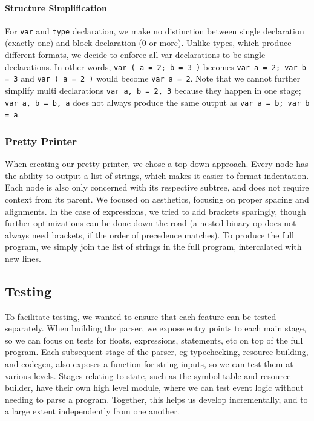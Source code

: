 \documentclass[11pt]{article}
\begin{document}
\paragraph{Structure Simplification}
For \texttt{var} and \texttt{type} declaration, we make no distinction
between single declaration (exactly one) and block declaration (0 or
more). Unlike types, which produce different formats, we decide to
enforce all var declarations to be single declarations. In other
words, \texttt{var ( a = 2; b = 3 )} becomes \texttt{var a = 2; var b = 3}
and \texttt{var ( a = 2 )} would become \texttt{var a = 2}. Note
that we cannot further simplify multi declarations \texttt{var a, b
  = 2, 3} because they happen in one stage;
  \texttt{var a, b = b, a} does not always produce the same output as
  \texttt{var a = b; var b = a}.

\subsubsection{Pretty Printer}
When creating our pretty printer, we chose a top down approach.  Every
node has the ability to output a list of strings, which makes it
easier to format indentation. Each node is also only concerned with
its respective subtree, and does not require context from its
parent. We focused on aesthetics, focusing on proper spacing and
alignments. In the case of expressions, we tried to add brackets
sparingly, though further optimizations can be done down the road (a
nested binary op does not always need brackets, if the order of
precedence matches). To produce the full program, we simply join the
list of strings in the full program, intercalated with new lines.

\subsection{Testing}

To facilitate testing, we wanted to ensure that each feature can
be tested separately.
When building the parser, we expose entry points to each main stage,
so we can focus on tests for floats, expressions, statements, etc
on top of the full program.
Each subsequent stage of the parser, eg typechecking, resource building, and codegen, also exposes a function for string inputs, so we can test them at various levels.
Stages relating to state, such as the symbol table and resource builder,
have their own high level module, where we can test event logic without
needing to parse a program. Together, this helps us develop incrementally,
and to a large extent independently from one another.
\end{document}
